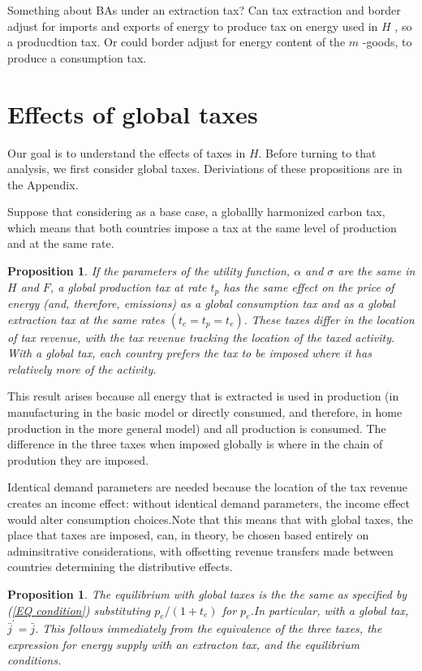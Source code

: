 \documentclass[notitlepage,12pt]{article}
\newtheorem{proposition}[theorem]{Proposition}
\begin{document}
Something about BAs under an extraction tax? Can tax extraction and border
adjust for imports and exports of energy to produce tax on energy used in $H$%
, so a producdtion tax. Or could border adjust for energy content of the $m$%
-goods, to produce a consumption tax. 

\section{Effects of global taxes}

Our goal is to understand the effects of taxes in $H$. Before turning to
that analysis, we first consider global taxes. Deriviations of these
propositions are in the Appendix.

Suppose that considering as a base case, a globallly harmonized carbon tax,
which means that both countries impose a tax at the same level of production
and at the same rate.

\begin{proposition}
If the parameters of the utility function, $\alpha $ and $\sigma $ are the
same in $H$ and $F$, a global production tax at rate $t_{p}$ has the same
effect on the price of energy (and, therefore, emissions) as a global
consumption tax and as a global extraction tax at the same rates $\left(
t_{c}=t_{p}=t_{e}\right) .$ These taxes differ in the location of tax
revenue, with the tax revenue tracking the location of the taxed activity.
With a global tax, each country prefers the tax to be imposed where it has
relatively more of the activity.
\end{proposition}

This result arises because all energy that is extracted is used in
production (in manufacturing in the basic model or directly consumed, and
therefore, in home production in the more general model) and all production
is consumed. The difference in the three taxes when imposed globally is
where in the chain of prodution they are imposed.

Identical demand parameters are needed because the location of the tax
revenue creates an income effect: without identical demand parameters, the
income effect would alter consumption choices.Note that this means that with
global taxes, the place that taxes are imposed, can, in theory, be chosen
based entirely on adminsitrative considerations, with offsetting revenue
transfers made between countries determining the distributive effects.

\begin{proposition}
The equilibrium with global taxes is the the same as specified by (\ref{EQ
condition}) substituting $p_{e}/\left( 1+t_{e}\right) $ for $p_{e}$.In
particular, with a global tax, $\bar{j}^{\prime }=\bar{j}$. This follows
immediately from the equivalence of the three taxes, the expression for
energy supply with an extracton tax, and the equilibrium conditions.
\end{proposition}
\end{document}
